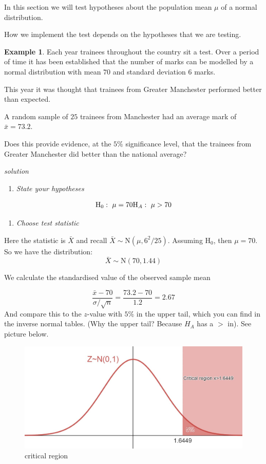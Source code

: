 \documentclass[
]{book}
\providecommand{\tightlist}{%
  \setlength{\itemsep}{0pt}\setlength{\parskip}{0pt}}
\theoremstyle{definition}
\theoremstyle{definition}
\newtheorem{example}{Example}[chapter]
\theoremstyle{definition}
\theoremstyle{definition}
\theoremstyle{remark}
\begin{document}
In this section we will test hypotheses about the population mean \(\mu\) of a normal distribution.

How we implement the test depends on the hypotheses that we are testing.

\begin{example}
Each year trainees throughout the country sit a test. Over a period of time it has been established that the number of marks can be modelled by a normal distribution with mean \(70\) and standard deviation \(6\) marks.

This year it was thought that trainees from Greater Manchester performed better than expected.

A random sample of \(25\) trainees from Manchester had an average mark of \(\bar{x}=73.2\).

Does this provide evidence, at the \(5\%\) significance level, that the trainees from Greater Manchester did better than the national average?
\end{example}

\emph{solution}

\begin{enumerate}
\def\labelenumi{\arabic{enumi}.}
\tightlist
\item
  \emph{State your hypotheses}
\end{enumerate}

\[\text{H}_0: \ \mu = 70 \\  \text{H}_A: \ \mu > 70\]

\begin{enumerate}
\def\labelenumi{\arabic{enumi}.}
\setcounter{enumi}{1}
\tightlist
\item
  \emph{Choose test statistic}
\end{enumerate}

Here the statistic is \(\bar{X}\) and recall \(\bar{X}\sim\text{N}(\mu,6^2/25)\). Assuming \(\text{H}_{0}\), then \(\mu=70\). So we have the distribution: \[\bar{X}\sim\text{N}(70,1.44)\]

We calculate the standardised value of the observed sample mean

\[\frac{\bar{x} - 70}{\sigma /\sqrt{ n}}=\frac{73.2 - 70}{1.2} = 2.67\]
And compare this to the \(z\)-value with \(5\%\) in the upper tail, which you can find in the inverse normal tables. (Why the upper tail? Because \(H_{A}\) has a \(>\) in). See picture below.

\begin{figure}

{\centering \includegraphics[width=0.75\linewidth]{./figures/criticalregion} 

}

\caption{critical region}\label{fig:crit1}
\end{figure}
\end{document}
